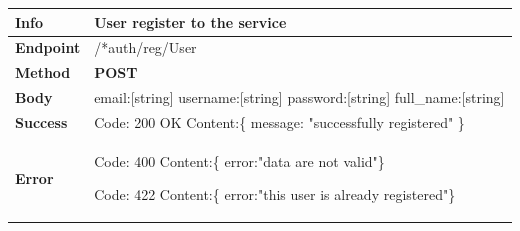 

\begin{table}[H]
\begin{tabular}{|l|p{}|}
\hline
\textbf{Info}             & User register to the service                                                                           \\ \hline
\textbf{Endpoint}    &  /*auth/reg/User\\ \hline
\textbf{Method}         &   \textbf{POST}                                                                            \\ \hline

\textbf{Body}  &   email:[string] \newline
                   username:[string] \newline
                   password:[string] \newline 
                   full\_name:[string]
                    \\ \hline
                    
\textbf{Success} &  Code: 200 OK \newline
                    Content:\{\newline 
                    message: "successfully registered"\newline 
                    \}\\ \hline
\textbf{Error} &  Code: 400 \newline
                  Content:\{\newline
                  error:"data are not valid"\newline\}\newline
                  
                  Code: 422 \newline
                  Content:\{\newline
                  error:"this user is already registered"\newline\}\\\hline

\end{tabular}
\end{table}






